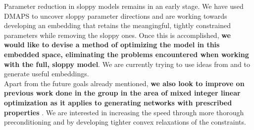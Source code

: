 \documentclass[12pt]{article}
\begin{document}
\begin{spacing}{2}
\indent Parameter reduction in sloppy models remains in an early
stage. We have used DMAPS to uncover sloppy parameter directions and
are working towards developing an embedding that retains the
meangingful, tightly constrained parameters while removing the sloppy
ones. Once this is accomplished, \textbf{we would like to devise a
  method of optimizing the model in this embedded space, eliminating
  the problems encountered when working with the full, sloppy
  model}. We are currently trying to use ideas from \cite{Dsilva} and
\cite{Lafon2004} to generate useful embeddings. \\

\indent Apart from the future goals already mentioned, \textbf{we also
  look to improve on previous work done in the group in the area of
  mixed integer linear optimization as it applies to generating
  networks with prescribed properties} \cite{Gounaris2013}. We are
interested in increasing the speed through more thorough
preconditioning and by developing tighter convex relaxations of the
constraints.


\end{spacing}
\end{document}
